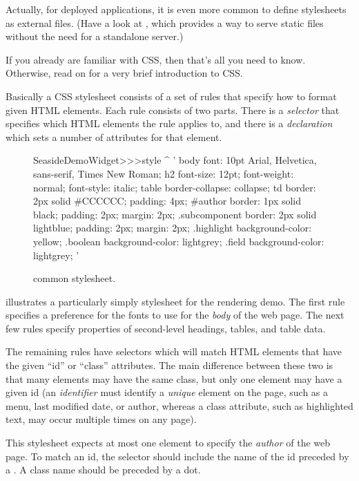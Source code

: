 \documentclass[a4paper,10pt,twoside]{book}
\begin{document}
Actually, for deployed applications, it is even more common to define stylesheets as external files.
(Have a look at , which provides a way to serve static files without the need for a standalone server.)

If you already are familiar with CSS, then that's all you need to know.
Otherwise, read on for a very brief introduction to CSS.

Basically a CSS stylesheet consists of a set of rules that specify how to format given HTML elements.
Each rule consists of two parts.
There is a \emph{selector} that specifies which HTML elements the rule applies to, and there is a \emph{declaration} which sets a number of attributes for that element.

\begin{figure}[tb]
\begin{code}{}
SeasideDemoWidget>>>style
	^ '
body {
	font: 10pt Arial, Helvetica, sans-serif, Times New Roman;
}
h2 {
	font-size: 12pt;
	font-weight: normal;
	font-style: italic;
}
table { border-collapse: collapse; }
td {
	border: 2px solid #CCCCCC;
	padding: 4px;
}
#author {
	border: 1px solid black;
	padding: 2px;
	margin: 2px;
}
.subcomponent {
	border: 2px solid lightblue;
	padding: 2px;
	margin: 2px;
}
.highlight { background-color: yellow; }
.boolean { background-color: lightgrey; }
.field { background-color: lightgrey; }
'
\end{code}
\caption{ common stylesheet.
\label{fig:democss}}
\end{figure}
 illustrates a particularly simply stylesheet for the rendering demo.
The first rule specifies a preference for the fonts to use for the \emph{body} of the web page.
The next few rules specify properties of second-level headings, tables, and table data.

The remaining rules have selectors which will match HTML elements that have the given ``id'' or ``class'' attributes.
The main difference between these two is that many elements may have the same class, but only one element may have a given id (\ie an \emph{identifier} must identify a \emph{unique} element on the page, such as a menu, last modified date, or author, whereas a class attribute, such as highlighted text, may occur multiple times on any page).

This stylesheet expects at most one element to specify the \emph{author} of the web page.
To match an id, the selector should include the name of the id preceded by a \ct{#}.
A class name should be preceded by a dot.
\end{document}
